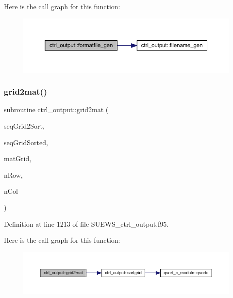 Here is the call graph for this function\+:\nopagebreak
\begin{figure}[H]
\begin{center}
\leavevmode
\includegraphics[width=350pt]{namespacectrl__output_a754f1fcb7692b22f531bcbd7fffd2634_cgraph}
\end{center}
\end{figure}
\mbox{\label{namespacectrl__output_a7c804abccd932d50e4938262f22f586e}} 
\subsubsection{\texorpdfstring{grid2mat()}{grid2mat()}}
{\footnotesize\ttfamily subroutine ctrl\+\_\+output\+::grid2mat (\begin{DoxyParamCaption}\item[{integer, dimension(nrow$\ast$ncol)}]{seq\+Grid2\+Sort,  }\item[{integer, dimension(nrow$\ast$ncol)}]{seq\+Grid\+Sorted,  }\item[{integer, dimension(nrow,ncol)}]{mat\+Grid,  }\item[{integer}]{n\+Row,  }\item[{integer}]{n\+Col }\end{DoxyParamCaption})}



Definition at line 1213 of file S\+U\+E\+W\+S\+\_\+ctrl\+\_\+output.\+f95.

Here is the call graph for this function\+:\nopagebreak
\begin{figure}[H]
\begin{center}
\leavevmode
\includegraphics[width=350pt]{namespacectrl__output_a7c804abccd932d50e4938262f22f586e_cgraph}
\end{center}
\end{figure}
\mbox{\label{namespacectrl__output_a06abc3039b8c610cb65b9cd42817d064}} 
